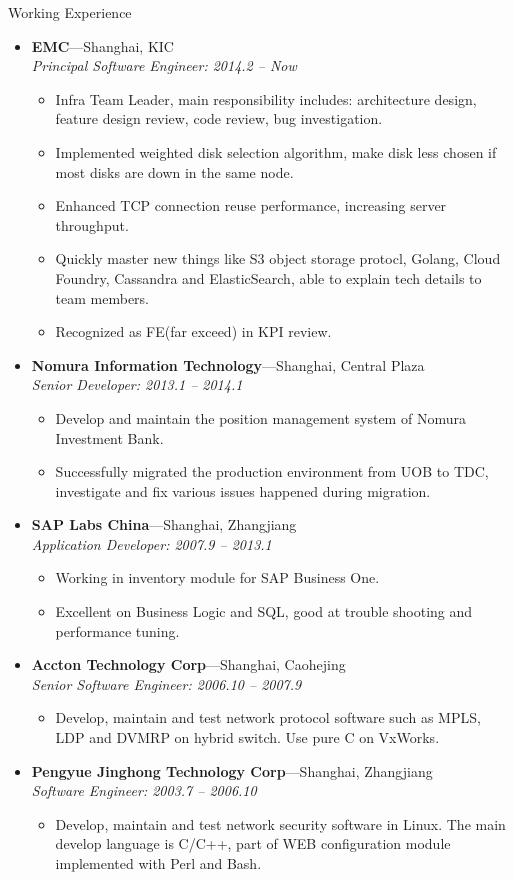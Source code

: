 \documentclass[11pt,oneside]{article}
\newenvironment{ressection}[1]{
	\vspace{4pt}
	{\selectfont\Large#1}
	\begin{itemize}
	\vspace{3pt}
}{
	\end{itemize}
}
\newcommand{\ressubitem}[1]{
	\vspace{-1pt}
	\item \begin{flushleft} #1 \end{flushleft}
}
\newcommand{\resbigitem}[3]{
	\vspace{-5pt}
	\item
	\textbf{#1}---#2 \\
	\textit{#3}
}
\newenvironment{ressubsec}[3]{
	\resbigitem{#1}{#2}{#3}
	\vspace{-2pt}
	\begin{itemize}
}{
    \end{itemize}
}
\begin{document}
\begin{ressection}{Working Experience}

	\begin{ressubsec}{EMC}{Shanghai, KIC}{Principal Software Engineer: 2014.2 -- Now}
		\ressubitem{Infra Team Leader, main responsibility includes: architecture design, feature design review, code review, bug investigation.}
		\ressubitem{Implemented weighted disk selection algorithm, make disk less chosen if most disks are down in the same node.}
		\ressubitem{Enhanced TCP connection reuse performance, increasing server throughput.}
		\ressubitem{Quickly master new things like S3 object storage protocl, Golang, Cloud Foundry, Cassandra and ElasticSearch, able to explain tech details to team members.}
		\ressubitem{Recognized as FE(far exceed) in KPI review.}
	\end{ressubsec}

	\begin{ressubsec}{Nomura Information Technology}{Shanghai, Central Plaza}{Senior Developer: 2013.1 -- 2014.1}
		\ressubitem{Develop and maintain the position management system of Nomura Investment Bank.}
		\ressubitem{Successfully migrated the production environment from UOB to TDC, investigate and
					fix various issues happened during migration.}
	\end{ressubsec}

	\begin{ressubsec}{SAP Labs China}{Shanghai, Zhangjiang}{Application Developer: 2007.9 -- 2013.1}
		\ressubitem{Working in inventory module for SAP Business One.}
		\ressubitem{Excellent on Business Logic and SQL, good at trouble shooting and performance tuning.}
	\end{ressubsec}

	\begin{ressubsec}{Accton Technology Corp}{Shanghai, Caohejing}{Senior Software Engineer: 2006.10 -- 2007.9}
		\ressubitem{Develop, maintain and test network protocol software such as MPLS, LDP and DVMRP on
					hybrid switch. Use pure C on VxWorks.}
	\end{ressubsec}

	\begin{ressubsec}{Pengyue Jinghong Technology Corp}{Shanghai, Zhangjiang}{Software Engineer: 2003.7 -- 2006.10}
		\ressubitem{Develop, maintain and test network security software in Linux. The main develop
					language is C/C++, part of WEB configuration module implemented with Perl and
					Bash.}
	\end{ressubsec}

\end{ressection}
\end{document}
